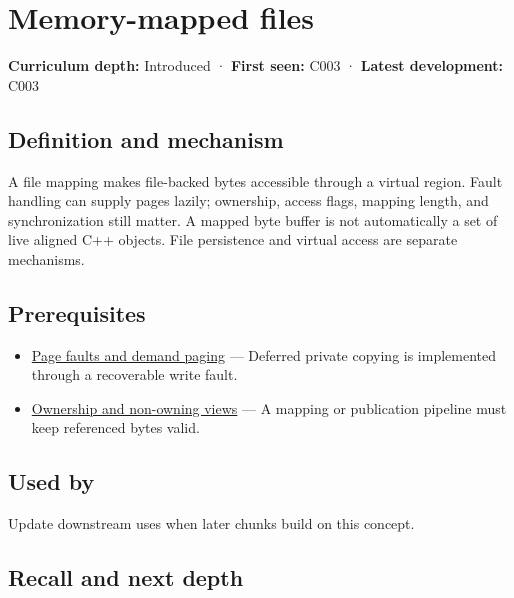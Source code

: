\hypertarget{appendix-313ee7a0ba7b}{}\label{referencestart:appendix-313ee7a0ba7b}
\section{Memory-mapped files}\label{appendix-313ee7a0ba7b-memory-mapped-files}

\textbf{Curriculum depth:} Introduced · \textbf{First seen:} C003 · \textbf{Latest development:} C003

\begin{allmightroledefinition}

\subsection{Definition and mechanism}\label{appendix-313ee7a0ba7b-definition-and-mechanism}

A file mapping makes file-backed bytes accessible through a virtual region. Fault handling can supply pages lazily; ownership, access flags, mapping length, and synchronization still matter. A mapped byte buffer is not automatically a set of live aligned C++ objects. File persistence and virtual access are separate mechanisms.

\end{allmightroledefinition}

\subsection{Prerequisites}\label{appendix-313ee7a0ba7b-prerequisites}

\begin{itemize}
\tightlist
\item
  \hyperref[appendix-cc0909a7ef14]{Page faults and demand paging} --- Deferred private copying is implemented through a recoverable write fault.
\item
  \hyperref[appendix-d52e4486f527]{Ownership and non-owning views} --- A mapping or publication pipeline must keep referenced bytes valid.
\end{itemize}

\subsection{Used by}\label{appendix-313ee7a0ba7b-used-by}

Update downstream uses when later chunks build on this concept.

\subsection{Recall and next depth}\label{appendix-313ee7a0ba7b-recall-and-next-depth}

